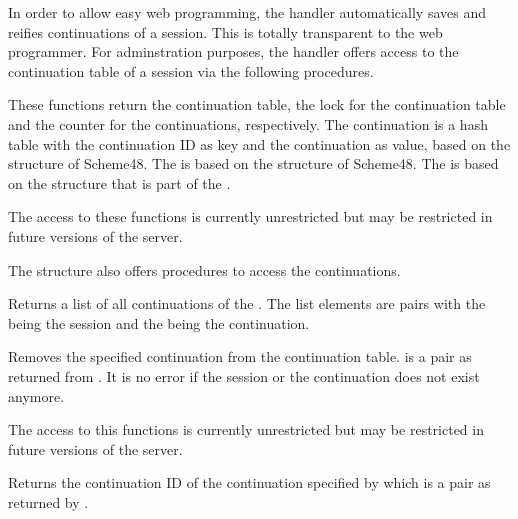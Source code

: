 In order to allow easy web programming, the \surflet handler
automatically saves and reifies continuations of a session.  This is
totally transparent to the web programmer.  For adminstration
purposes, the \surflet handler offers access to the continuation table
of a session via the following procedures.

\begin{desc}
  These functions return the continuation table, the lock for the
  continuation table and the counter for the continuations,
  respectively.  The continuation  is a hash table with the
  continuation ID as key and the continuation as value, based on the
   structure of Scheme48.  The  is based on the
   structure of Scheme48.  The  is
  based on the  structure that is part of the
  \surflets.

  The access to these functions is currently unrestricted but may be
  restricted in future versions of the \surflet server.
\end{desc}

The  structure also offers procedures to
access the continuations.

\begin{desc}
  Returns a list of all continuations of the .  The list
  elements are pairs with the  being the session and the
   being the continuation.
\end{desc}

\begin{desc}
  Removes the specified continuation from the continuation table.
   is a pair as returned from
  .  It is no error if the session or the
  continuation does not exist anymore.

  The access to this functions is currently unrestricted but may be
  restricted in future versions of the \surflet server.
\end{desc}

\begin{desc}
  Returns the continuation ID of the continuation specified by
   which is a pair as returned by
  . 
\end{desc}

